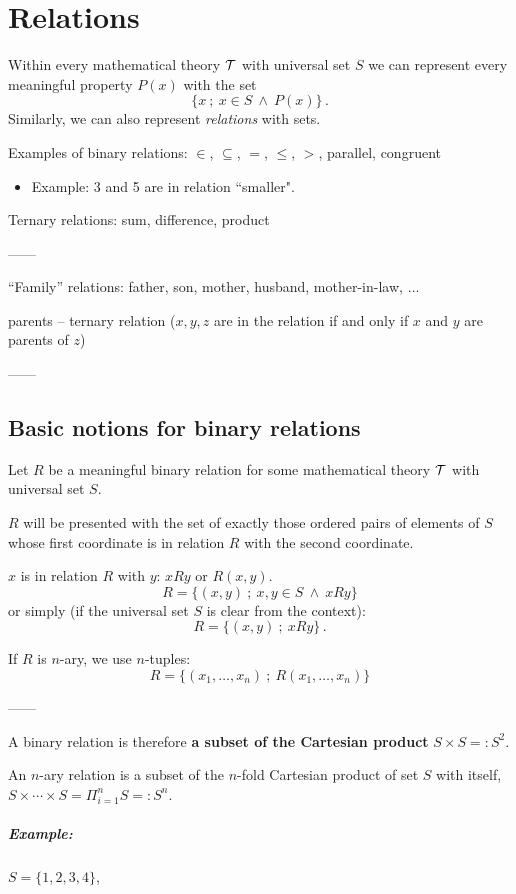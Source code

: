 \documentclass[11pt,paper=b5,footinclude,headinclude]{scrbook} %
\def\inn {{~\wedge~}}
\def\zgled{\paragraph{Example:}}
\theoremstyle{remark}
\theoremstyle{definition} %
\theoremstyle{theorem} %
\begin{document}
\chapter{Relations}

Within every mathematical theory ${\cal T}$ with universal set $S$
we can represent every meaningful property $P(x)$
with the set $$\{x~;~x\in S\inn P(x)\}\,.$$
Similarly, we can also represent {\em relations} with sets.

\medskip
Examples of binary relations: $\in$, $\subseteq$, $=$, $\le$, $>$, parallel, congruent
\begin{itemize}
          \item Example: 3 and 5 are in relation ``smaller".
\end{itemize}
Ternary relations: sum, difference, product

------

``Family'' relations: father, son, mother, husband, mother-in-law, $\ldots$

parents -- ternary relation ($x,y,z$ are in the relation if and only if $x$ and $y$ are parents of $z$)

------
\section{Basic notions for binary relations}

Let $R$ be a meaningful binary relation for some mathematical theory ${\cal T}$ with universal set $S$.

$R$ will be presented with the set of exactly those ordered pairs of elements of $S$
whose first coordinate is in relation $R$ with the second coordinate.

$x$ is in relation $R$ with  $y$: $xRy$ or $R(x,y)$.
$$R = \{(x,y)~;~x,y\in S\inn xRy\}$$
or simply (if the universal set $S$ is clear from the context):
$$R = \{(x,y)~;~xRy\}\,.$$

\medskip
If $R$ is $n$-ary, we use $n$-tuples:
$$R = \{(x_1,\ldots, x_n)~;~R(x_1,\ldots, x_n)\}$$

------

A binary relation is therefore \textbf{ a subset of the Cartesian product} $S \times S =: S^2$.

An $n$-ary relation is a subset of the $n$-fold Cartesian product of set $S$ with itself,
$S \times \cdots \times S = \Pi_ {i = 1}^nS =: S^n$.

\bigskip
\zgled

$S = \{1,2,3,4\}$,
\end{document}
